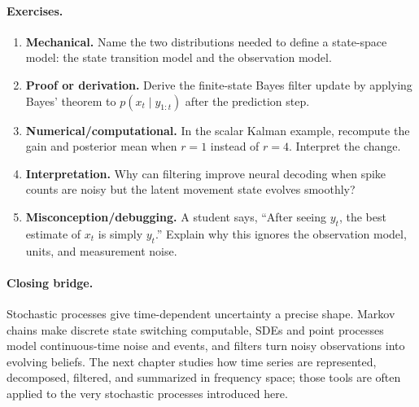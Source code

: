 \paragraph{Exercises.}
\begin{enumerate}[label=\textbf{27.4.\arabic*.}, leftmargin=*]
\item \textbf{Mechanical.} Name the two distributions needed to define a state-space model: the state transition model and the observation model.
\item \textbf{Proof or derivation.} Derive the finite-state Bayes filter update by applying Bayes' theorem to \(p(x_t\mid y_{1:t})\) after the prediction step.
\item \textbf{Numerical/computational.} In the scalar Kalman example, recompute the gain and posterior mean when \(r=1\) instead of \(r=4\). Interpret the change.
\item \textbf{Interpretation.} Why can filtering improve neural decoding when spike counts are noisy but the latent movement state evolves smoothly?
\item \textbf{Misconception/debugging.} A student says, ``After seeing \(y_t\), the best estimate of \(x_t\) is simply \(y_t\).'' Explain why this ignores the observation model, units, and measurement noise.
\end{enumerate}

\paragraph{Closing bridge.}
Stochastic processes give time-dependent uncertainty a precise shape. Markov chains make discrete state switching computable, SDEs and point processes model continuous-time noise and events, and filters turn noisy observations into evolving beliefs. The next chapter studies how time series are represented, decomposed, filtered, and summarized in frequency space; those tools are often applied to the very stochastic processes introduced here.

\clearpage
